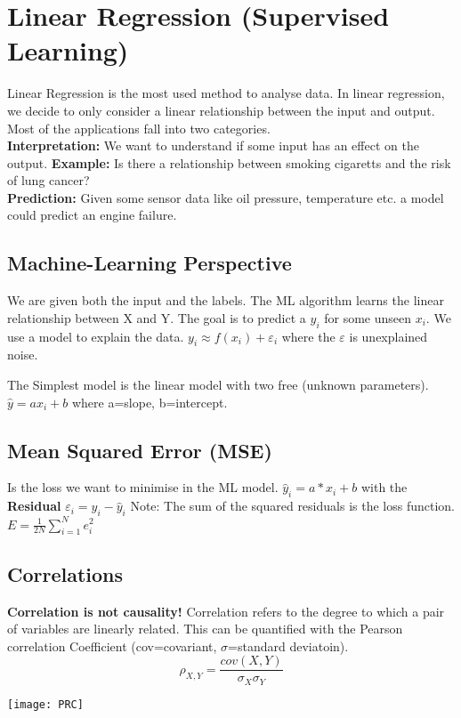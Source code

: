 \section{Linear Regression (Supervised Learning)}
Linear Regression is the most used method to analyse data. In linear regression, we  decide to only consider a linear relationship between the input and output. Most of the applications fall into two categories. \\
\textbf{Interpretation:} We want to understand if some input has an effect on the output. \textbf{Example:} Is there a
relationship between smoking cigaretts and the risk of lung cancer?\\
\textbf{Prediction:} Given some sensor data like oil pressure, temperature etc. a model could predict an engine failure.

\subsection{Machine-Learning Perspective}
We are given both the input and the labels. The ML algorithm learns the linear relationship between X and Y. The goal is to predict a $y_{i}$ for some unseen $x_{i}$. We use a model to explain the data. $y_{i}\approx f(x_{i}) + \varepsilon_{i}$ where the $\varepsilon$ is unexplained noise.

The Simplest model is the linear model with two free (unknown parameters).
$\hat{y} = ax_{i} + b$ where a=slope, b=intercept.

\subsection{Mean Squared Error (MSE)}
Is the loss we want to minimise in the ML model. $\hat{y}_{i}=a * x_{i}+b$ with the \textbf{Residual} $\varepsilon_{i}=y_{i}-\hat{y}_{i}$ Note: The sum of the squared residuals is the loss function. $E=\frac{1}{2N} \sum_{i=1}^N e_{i}^2$

\subsection{Correlations}
\begin{minipage}{0,5\linewidth}
	\textbf{Correlation is not causality!} Correlation refers to the degree to which a pair of variables are linearly related. This can be quantified with the Pearson correlation Coefficient (cov=covariant, $\sigma$=standard deviatoin).
	\[ \rho_{X,Y} = \frac{cov(X,Y)}{\sigma_{X} \sigma_{Y}}  \]  
\end{minipage}
\begin{minipage}{0,5\linewidth}
	\texttt{[image: PRC]}
\end{minipage}
